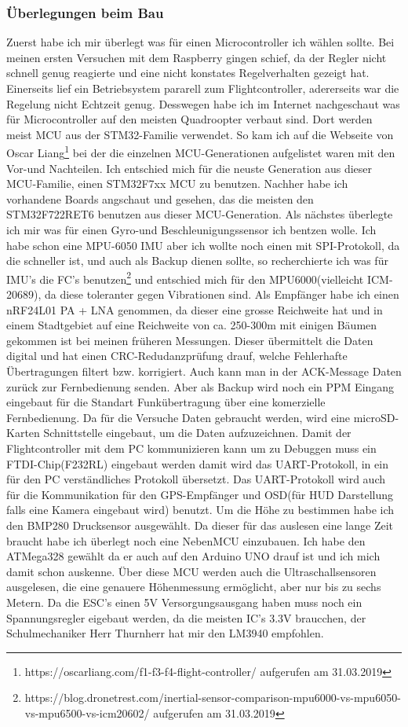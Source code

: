 \documentclass[12pt,a4paper, ngerman]{article}
\begin{document}
\subsubsection{Überlegungen beim Bau}
Zuerst habe ich mir überlegt was für einen Microcontroller ich wählen sollte. Bei meinen ersten Versuchen mit dem Raspberry gingen schief, da der Regler nicht schnell genug reagierte und eine nicht konstates Regelverhalten gezeigt hat. Einerseits lief ein Betriebsystem pararell zum Flightcontroller, adererseits war die Regelung nicht Echtzeit genug. Desswegen habe ich im Internet nachgeschaut was für Microcontroller auf den meisten Quadroopter verbaut sind. Dort werden  meist MCU aus der STM32-Familie verwendet. So kam ich auf die Webseite von Oscar Liang\footnote{\label{foot:1}https://oscarliang.com/f1-f3-f4-flight-controller/ aufgerufen am 31.03.2019} bei der die einzelnen MCU-Generationen aufgelistet waren mit den Vor-und Nachteilen. Ich entschied mich für die neuste Generation aus dieser MCU-Familie, einen STM32F7xx MCU zu benutzen. Nachher habe ich vorhandene Boards angschaut und gesehen, das die meisten den STM32F722RET6 benutzen aus dieser MCU-Generation. Als nächstes überlegte ich mir was für einen Gyro-und Beschleunigungssensor ich bentzen wolle. Ich habe schon eine MPU-6050 IMU aber ich wollte noch einen mit SPI-Protokoll, da die schneller ist, und auch als Backup dienen sollte, so recherchierte ich was für IMU's die FC's benutzen\footnote{\label{foot:2}https://blog.dronetrest.com/inertial-sensor-comparison-mpu6000-vs-mpu6050-vs-mpu6500-vs-icm20602/ aufgerufen am 31.03.2019} und entschied mich für den MPU6000(vielleicht ICM-20689), da diese toleranter gegen Vibrationen sind. Als Empfänger habe ich einen nRF24L01 PA + LNA genommen, da dieser eine grosse Reichweite hat und in einem Stadtgebiet auf eine Reichweite von ca. 250-300m mit einigen Bäumen gekommen ist bei meinen früheren Messungen. Dieser übermittelt die Daten digital und hat einen CRC-Redudanzprüfung drauf, welche Fehlerhafte Übertragungen filtert bzw. korrigiert. Auch kann man in der ACK-Message Daten zurück zur Fernbedienung senden. Aber als Backup wird noch ein PPM Eingang eingebaut für die Standart Funkübertragung über eine komerzielle Fernbedienung. Da für die Versuche Daten gebraucht werden, wird eine microSD-Karten Schnittstelle eingebaut, um die Daten aufzuzeichnen. Damit der Flightcontroller mit dem PC kommunizieren kann um zu Debuggen muss ein FTDI-Chip(F232RL) eingebaut werden damit wird das UART-Protokoll, in ein für den PC verständliches Protokoll übersetzt. Das UART-Protokoll wird auch für die Kommunikation für den GPS-Empfänger und OSD(für HUD Darstellung falls eine Kamera eingebaut wird) benutzt. Um die Höhe zu bestimmen habe ich den BMP280 Drucksensor ausgewählt. Da dieser für das auslesen eine lange Zeit braucht habe ich überlegt noch eine NebenMCU einzubauen. Ich habe den ATMega328 gewählt da er auch auf den Arduino UNO drauf ist und ich mich damit schon auskenne. Über diese MCU werden auch die Ultraschallsensoren ausgelesen, die eine genauere Höhenmessung ermöglicht, aber nur bis zu sechs Metern. Da die ESC's einen 5V Versorgungsausgang haben muss noch ein Spannungsregler  eigebaut werden, da die meisten IC's 3.3V braucchen, der Schulmechaniker Herr Thurnherr hat mir den LM3940 empfohlen. 
\end{document}
